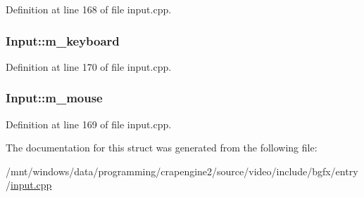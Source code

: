 Definition at line 168 of file input.\+cpp.

\hypertarget{struct_input_a8caf87f551f51c9b466c0aeaa04853b4}{
\subsubsection[{m\+\_\+keyboard}]{ Input\+::m\+\_\+keyboard}}\label{struct_input_a8caf87f551f51c9b466c0aeaa04853b4}


Definition at line 170 of file input.\+cpp.

\hypertarget{struct_input_acab349ae5eebd1c04bd2b1a38ed8cd7e}{
\subsubsection[{m\+\_\+mouse}]{ Input\+::m\+\_\+mouse}}\label{struct_input_acab349ae5eebd1c04bd2b1a38ed8cd7e}


Definition at line 169 of file input.\+cpp.



The documentation for this struct was generated from the following file\+:\begin{DoxyCompactItemize}
\item 
/mnt/windows/data/programming/crapengine2/source/video/include/bgfx/entry/\hyperlink{input_8cpp}{input.\+cpp}\end{DoxyCompactItemize}
